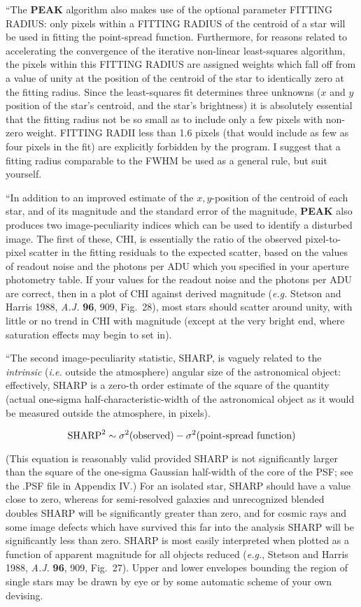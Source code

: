 ``The {\bf PEAK} algorithm also makes use of the optional parameter
FITTING RADIUS:  only pixels within a FITTING RADIUS of the centroid of
a star will be used in fitting the point-spread function.  Furthermore,
for reasons related to accelerating the convergence of the iterative
non-linear least-squares algorithm, the pixels within this FITTING
RADIUS are assigned weights which fall off from a value of unity at the
position of the centroid of the star to identically zero at the fitting
radius.  Since the least-squares fit determines three unknowns ($x$ and
$y$ position of the star's centroid, and the star's brightness) it is
absolutely essential that the fitting radius not be so small as to
include only a few pixels with non-zero weight.  FITTING RADII less
than 1.6 pixels (that would include as few as four pixels in the fit)
are explicitly forbidden by the program.  I suggest that a fitting
radius comparable to the FWHM be used as a general rule, but suit
yourself.

``In addition to an improved estimate of the $x,y$-position of the
centroid of each star, and of its magnitude and the standard error of
the magnitude, {\bf PEAK} also produces two image-peculiarity indices
which can be used to identify a disturbed image.  The first of these,
CHI, is essentially the ratio of the observed pixel-to-pixel scatter in
the fitting residuals to the expected scatter, based on the values of
readout noise and the photons per ADU which you specified in your
aperture photometry table.  If your values for the readout noise and
the photons per ADU are correct, then in a plot of CHI against derived
magnitude ({\it e.g.} Stetson and Harris 1988, {\it A.J.} {\bf 96},
909, Fig.~28), most stars should scatter around unity, with little or
no trend in CHI with magnitude (except at the very bright end, where
saturation effects may begin to set in).

``The second image-peculiarity statistic, SHARP, is vaguely related to
the {\it intrinsic\/} ({\it i.e.\/} outside the atmosphere) angular
size of the astronomical object:  effectively, SHARP is a zero-th order
estimate of the square of the quantity (actual one-sigma
half-characteristic-width of the astronomical object as it would be
measured outside the atmosphere, in pixels).

$$ \hbox{\rm SHARP}^2 \sim
\sigma^2(\hbox{\rm observed}) - \sigma^2(\hbox{\rm point-spread
function})$$ 

\noindent (This equation is reasonably valid provided SHARP is not
significantly larger than the square of the one-sigma Gaussian
half-width of the core of the PSF; see the .PSF file in Appendix IV.)
For an isolated star, SHARP should have a value close to zero, whereas
for semi-resolved galaxies and unrecognized blended doubles SHARP will
be significantly greater than zero, and for cosmic rays and some image
defects which have survived this far into the analysis SHARP will be
significantly less than zero.  SHARP is most easily interpreted when
plotted as a function of apparent magnitude for all objects reduced
({\it e.g.}, Stetson and Harris 1988, {\it A.J.} {\bf 96}, 909,
Fig.~27). Upper and lower envelopes bounding the region of single stars
may be drawn by eye or by some automatic scheme of your own devising.

